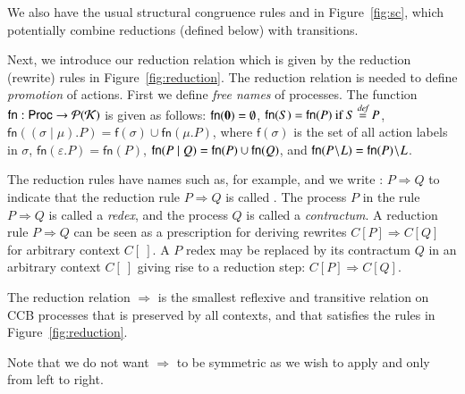 {We also have the usual structural congruence rules 
 and  in Figure~\ref{fig:sc}, 
which potentially combine reductions (defined below) with transitions.

Next, we introduce our reduction relation which is given by the reduction (rewrite) rules 
in Figure~\ref{fig:reduction}. The reduction relation is needed to define {\em promotion} 
of actions. First we define {\em free names} of processes. 
%
The function 
$\mathsf{fn}: \mathsf{Proc} \rightarrow \mathcal{P}(\mathcal{K})$ is given as follows: 
$\mathsf{fn}(\mathbf{0}) = \emptyset$,
$\mathsf{fn}(S)=\mathsf{fn}(P) \text{ if }  S\stackrel{\emph{def}}{=} P$, 
$\mathsf{fn}((\sigma\mid \mu).P)=\mathsf{f}(\sigma)\cup \mathsf{fn}(\mu.P)$, where $\mathsf{f}(\sigma)$ is the set of all action labels in $\sigma$,
$\mathsf{fn}(\varepsilon.P)=\mathsf{fn}(P) $, $\mathsf{fn}(P\; \vert \; Q)=\mathsf{fn}(P) \cup \mathsf{fn}(Q)$, and $\mathsf{fn}(P \!\setminus\!L)=\mathsf{fn}(P) \!\setminus\!L$.


The reduction rules have names such as, for example,  and we write 
: $P \Rightarrow Q$
to indicate that the reduction rule $P \Rightarrow Q$ is called . 
The process $P$ in the rule
$P\Rightarrow Q$ is called a \emph{redex}, and the process $Q$ is called a \emph{contractum}. 
A reduction rule $P\Rightarrow Q$ can be seen as a prescription 
for deriving rewrites $C[P] \Rightarrow C[Q]$ for arbitrary context $C[\ ]$. 
A $P$ redex may be replaced by its contractum $Q$ in an arbitrary context 
$C[\ ]$ giving rise to a reduction step: $C[P] \Rightarrow C[Q]$.

\begin{definition} \normalfont The reduction relation $\Rightarrow$ is the smallest reflexive and 
transitive relation on CCB processes that is preserved by all contexts, and that satisfies the rules 
in Figure~\ref{fig:reduction}.
\end{definition}
Note that we do not want $\Rightarrow$ to be symmetric as we wish to apply  and  only 
from left to right. 

}
